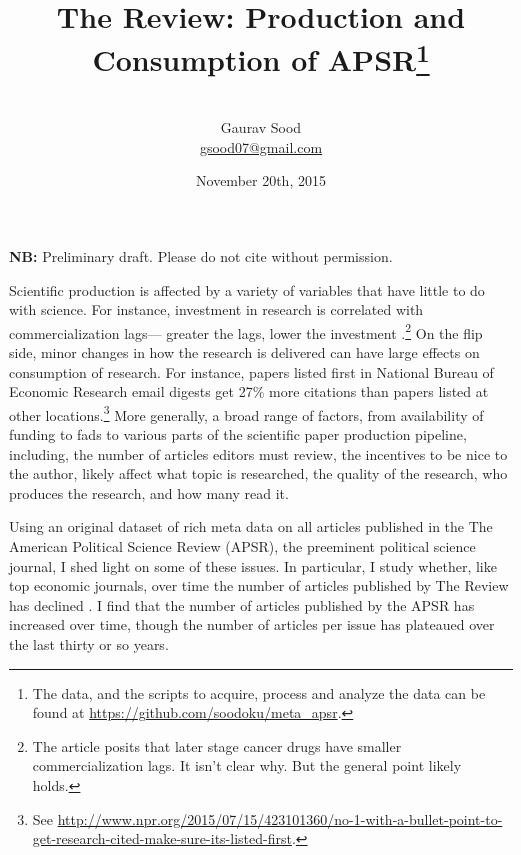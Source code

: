 \documentclass[12pt]{article}
\begin{document}
\title{\vspace{-.5cm}\normalsize{The Review: Production and Consumption of APSR\footnote{The data, and the scripts to acquire, process and analyze the data can be found at \href{https://github.com/soodoku/meta_apsr}{https://github.com/soodoku/meta\_apsr}.}
}}
\author{\vspace{.2cm}\\\normalsize{Gaurav Sood}\\\href{mailto:gsood07@gmail.com}{\small{gsood07@gmail.com}}\vspace{.3cm}\\}
\date{\normalsize{November 20th, 2015}}
\maketitle
\begin{center}
\textbf{NB:} Preliminary draft. Please do not cite without permission.
\end{center}
\vspace{.4cm}
\doublespacing

Scientific production is affected by a variety of variables that have little to do with science. For instance, investment in research is correlated with commercialization lags--- greater the lags, lower the investment \citep{budish2013firms}.\footnote{The article posits that later stage cancer drugs have smaller commercialization lags. It isn't clear why. But the general point likely holds.} On the flip side, minor changes in how the research is delivered can have large effects on consumption of research. For instance, papers listed first in National Bureau of Economic Research email digests get 27\% more citations than papers listed at other locations.\footnote{ See \href{http://www.npr.org/2015/07/15/423101360/no-1-with-a-bullet-point-to-get-research-cited-make-sure-its-listed-first}{http://www.npr.org/2015/07/15/423101360/no-1-with-a-bullet-point-to-get-research-cited-make-sure-its-listed-first}.} More generally, a broad range of factors, from availability of funding to fads to various parts of the scientific paper production pipeline, including, the number of articles editors must review, the incentives to be nice to the author, likely affect what topic is researched, the quality of the research, who produces the research, and how many read it. 

Using an original dataset of rich meta data on all articles published in the The American Political Science Review (APSR), the preeminent political science journal, I shed light on some of these issues. In particular, I study whether, like top economic journals, over time the number of articles published by The Review has declined \citep{card2013nine, card2014page}. I find that the number of articles published by the APSR has increased over time, though the number of articles per issue has plateaued over the last thirty or so years.
\end{document}
